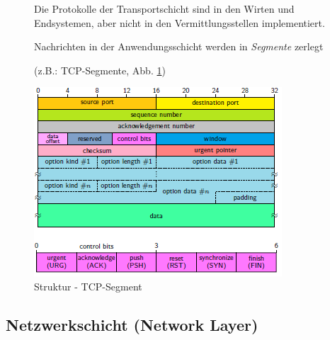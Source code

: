 \documentclass[12pt]{report}
\begin{document}
\begin{figure}[H]
  \begin{minipage}[t]{0.45\textwidth}
    Die Protokolle der Transportschicht sind in den Wirten und Endsystemen, aber nicht in den Vermittlungsstellen implementiert.

    Nachrichten in der Anwendungsschicht werden in \textit{Segmente} zerlegt

    (z.B.: TCP-Segmente, Abb. \ref{fig:tcp_segment})
  \end{minipage}
  \hfill
  \begin{minipage}[t]{0.45\textwidth}
    \caption{Struktur - TCP-Segment}
    \label{fig:tcp_segment}
    \centering
    \includegraphics[width=\textwidth]{tcp_diagram}
  \end{minipage}
\end{figure}


\subsection{Netzwerkschicht (Network Layer)}
\end{document}
